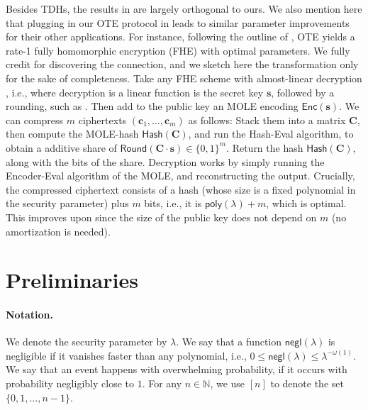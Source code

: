 \documentclass{theoretics}
\newcommand{\N}{\mathbb{N}}
\newcommand{\poly}{\mathsf{poly}}
\newcommand{\negl}{\mathsf{negl}}
\renewcommand{\sec}{\ensuremath{\lambda}}
\begin{document}
Besides TDHs, the results in \cite{EC:BJSS25} are largely orthogonal to ours. We also mention here that plugging in our OTE protocol in \cite{EC:BJSS25} leads to similar parameter improvements for their other applications. For instance, following the outline of \cite{EC:BJSS25}, OTE yields a rate-1 fully homomorphic encryption (FHE) with optimal parameters. We fully credit \cite{EC:BJSS25} for discovering the connection, and we sketch here the transformation only for the sake of completeness. Take any FHE scheme with almost-linear decryption \cite{TCC:BDGM19}, i.e., where decryption is a linear function is the secret key $\mathbf{s}$, followed by a rounding, such as \cite{C:GenSahWat13}. Then add to the public key an MOLE encoding $\mathsf{Enc}(\mathbf{s})$. We can compress $m$ ciphertexts $(\mathbf{c}_1, \dots, \mathbf{c}_m)$ as follows: Stack them into a matrix $\mathbf{C}$, then compute the MOLE-hash $\mathsf{Hash}(\mathbf{C})$, and run the Hash-Eval algorithm, to obtain a additive share of $\mathsf{Round}(\mathbf{C}\cdot \mathbf{s}) \in \{0,1\}^m$. Return the hash $\mathsf{Hash}(\mathbf{C})$, along with the bits of the share. Decryption works by simply running the Encoder-Eval algorithm of the MOLE, and reconstructing the output. Crucially, the compressed ciphertext consists of a hash (whose size is a fixed polynomial in the security parameter) plus $m$ bits, i.e., it is $\poly(\lambda) + m$, which is optimal. This improves upon \cite{TCC:BDGM19} since the size of the public key does not depend on $m$ (no amortization is needed).

\section{Preliminaries}
\paragraph{Notation.}
We denote the security parameter by $\sec$. We say that a function $\negl(\sec)$ is negligible if it vanishes faster than any polynomial, i.e., $0\le \negl(\sec) \leq \sec^{-\omega(1)}$. We say that an event happens with overwhelming probability, if it occurs with probability negligibly close to $1$. For any $n\in\N$, we use $[n]$ to denote the set $\{0, 1, \dots, n-1\}$. 
\end{document}
